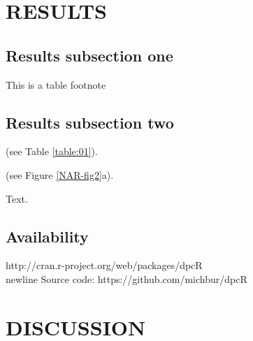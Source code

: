 \documentclass[a4,center,fleqn]{NAR}
\begin{document}
\section{RESULTS}

\subsection{Results subsection one}



\begin{table}[b]
{This is a table footnote}
\end{table}


\subsection{Results subsection two}

(see Table \ref{table:01}).

(see Figure \ref{NAR-fig2}a).

Text.



\subsection{Availability}

http://cran.r-project.org/web/packages/dpcR\\newline
Source code: https://github.com/michbur/dpcR\

\section{DISCUSSION}
\end{document}

